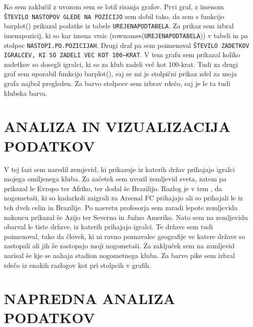 \documentclass[11pt,a4paper]{article}
\begin{document}
Ko sem zaklučil z uvozom sem se lotil risanja grafov. Prvi graf, z imenom \verb|ŠTEVILO NASTOPOV GLEDE NA POZICIJO| sem dobil tako, da sem s funkcijo barplot() prikazal podatke iz tabele \verb|UREJENAPODTABELA|. Za prikaz sem izbral imenapozicij, ki so kar imena vrsic (rownames(\verb|UREJENAPODTABELA|)) v tabeli in pa stolpec \verb|NASTOPI.PO.POZICIJAH|.
Drugi draf pa sem poimenoval \verb|ŠTEVILO ZADETKOV IGRALCEV, KI SO ZADELI VEC KOT 100−KRAT|. V tem grafu sem prikazal koliko zadetkov so dosegli igralci, ki so za klub zadeli več kot 100-krat. Tudi za drugi graf sem uporabil funkcijo barplot(), saj se mi je stolpični prikaz zdel za moja grafa najbol pregleden. Za barvo stolpcev sem izbrav rdečo, saj je le ta tudi klubska barva.




\newpage
\section{ANALIZA IN VIZUALIZACIJA PODATKOV}
V tej fazi sem naredil zemjevid, ki prikazuje iz katerih držav prihajajo igralci mojega omiljenega kluba. Za začetek sem uvozil zemljevid sveta, zatem pa prikazal le Evropo ter Afriko, ter dodal še Brazilijo. Razlog je v tem , da nogometaši, ki so kadarkoli zaigrali za Arsenal FC prihajajo ali so prihajali le iz teh dveh celin in Brazilije. Po nasvetu profesorja sem zaradi lepote zemljevida nakoncu prikazal še Azijo ter Severno in Južno Ameriko. Nato sem na zemljevidu obarval le tiste države, iz katerih prihajajo igralci. Te države sem tudi poimenoval, tako da človek, ki ni ravno poznavalec geografije ve katere države so zastopali ali jih še zastopajo moji nogometaši. Za zaključek sem na zamljevid narisal še kje se nahaja stadion nogometnega kluba. Za barvo pike sem izbral rdečo iz enakih razlogov kot pri stolpcih v grafih.



\section{NAPREDNA ANALIZA PODATKOV}
\end{document}
